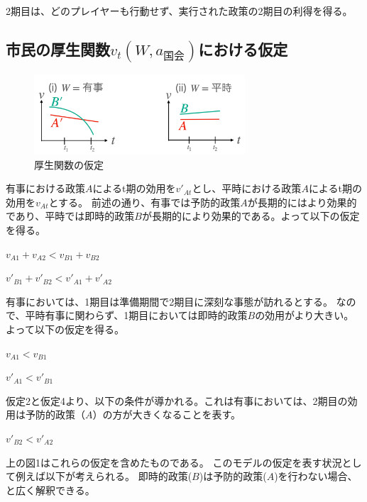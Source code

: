 \documentclass[main.tex]{subfiles}
\begin{document}
2期目は、どのプレイヤーも行動せず、実行された政策の2期目の利得を得る。




\subsection{市民の厚生関数$v_t(W, a_{国会})$における仮定}

\begin{figure}[htbp]
  \centering
  \includegraphics[width=0.7\textwidth]{./image/assumption_welfare_policy.png}
  \caption{厚生関数の仮定} 
  \label{fig:assumption_welfare_policy}
\end{figure}

有事における政策$A$によるt期の効用を$v'_{At}$とし、平時における政策$A$によるt期の効用を$v_{At}$とする。
前述の通り、有事では予防的政策$A$が長期的にはより効果的であり、平時では即時的政策$B$が長期的により効果的である。よって以下の仮定を得る。
\begin{assumption}  $v_{A1} + v_{A2} < v_{B1} + v_{B2}$ \end{assumption}
\begin{assumption}  $v'_{B1} + v'_{B2} < v'_{A1} + v'_{A2}$ \end{assumption}


有事においては、1期目は準備期間で2期目に深刻な事態が訪れるとする。
なので、平時有事に関わらず、1期目においては即時的政策$B$の効用がより大きい。よって以下の仮定を得る。
\begin{assumption}  $v_{A1} < v_{B1}$  \end{assumption}
\begin{assumption}  $v'_{A1} < v'_{B1}$ \end{assumption}

仮定2と仮定4より、以下の条件が導かれる。これは有事においては、2期目の効用は予防的政策（$A$）の方が大きくなることを表す。
\begin{condition}  $v'_{B2} < v'_{A2}$ \end{condition}


上の図1はこれらの仮定を含めたものである。
このモデルの仮定を表す状況として例えば以下が考えられる。
即時的政策($B$)は予防的政策($A$)を行わない場合、と広く解釈できる。
\end{document}
